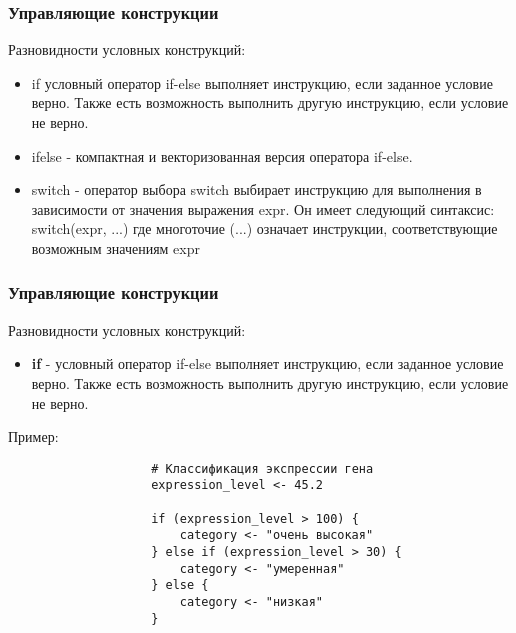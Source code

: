 \documentclass[10pt]{beamer}
\begin{document}
	\begin{frame}
		\frametitle{Управляющие конструкции}
		Разновидности условных конструкций:
		\begin{itemize}
			\item if условный оператор if-else выполняет инструкцию, если заданное условие верно. Также есть возможность выполнить другую инструкцию, если условие не верно.
			
			\item ifelse - компактная и векторизованная версия оператора if-else.
			
			\item switch - оператор выбора switch выбирает инструкцию для выполнения в зависимости от значения выражения expr. Он имеет следующий синтаксис: switch(expr, ...) где многоточие (...) означает инструкции, соответствующие возможным значениям expr
		\end{itemize}
	\end{frame}	
	
	\begin{frame}[fragile]
		\frametitle{Управляющие конструкции}
		Разновидности условных конструкций:
		\begin{itemize}
			\item \textbf{if} - условный оператор if-else выполняет инструкцию, если заданное условие верно. Также есть возможность выполнить другую инструкцию, если условие не верно.
		\end{itemize}
		
		\begin{exampleblock}{Пример:}
			{\footnotesize
				\begin{verbatim}
					# Классификация экспрессии гена
					expression_level <- 45.2
					
					if (expression_level > 100) {
						category <- "очень высокая"
					} else if (expression_level > 30) {
						category <- "умеренная"
					} else {
						category <- "низкая"
					}
					
				\end{verbatim}
			}
		\end{exampleblock}
	\end{frame}
	
\end{document}
